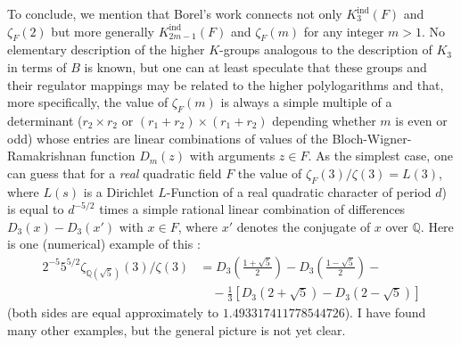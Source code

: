 To conclude, we mention that Borel's work connects not only $K^{\text{ind}}_{3}(F)$ and $\zeta_{F}(2)$ but more generally $K^{\text{ind}}_{2m-1}(F)$ and $\zeta_{F}(m)$ for any integer $m>1$. No elementary description of the higher $K$-groups analogous to the description of $K_{3}$ in terms of $B$ is known, but one can at least speculate that these groups and their regulator mappings may be related to the higher polylogarithms and that, more specifically, the value of $\zeta_{F}(m)$ is always a simple multiple of a determinant ($r_{2}\times r_{2}$ or $(r_{1}+r_{2})\times (r_{1}+r_{2})$ depending whether $m$ is even or odd) whose entries are linear combinations of values of the Bloch-Wigner-Ramakrishnan function $D_{m}(z)$ with arguments $z\in F$. As the simplest case, one can guess that for a {\em real} quadratic field $F$ the value of $\zeta_{F}(3)/\zeta(3)=L(3)$, where $L(s)$ is a Dirichlet $L$-Function of a real quadratic character of period $d$) is equal to $d^{-5/2}$ times a simple rational linear combination of differences $D_{3}(x)-D_{3}(x')$ with $x\in F$, where $x'$ denotes the conjugate of $x$ over $\mathbb{Q}$. Here is one (numerical) example of this :
\begin{align*}
2^{-5}5^{5/2}\zeta_{\mathbb{Q}(\sqrt{5})}(3)/\zeta(3) &= D_{3}\left(\frac{1+\sqrt{5}}{2}\right)-D_{3}\left(\frac{1-\sqrt{5}}{2}\right)-{}\\
&\quad {}-\frac{1}{3}[D_{3}(2+\sqrt{5})-D_{3}(2-\sqrt{5})]
\end{align*}
(both sides are equal approximately to $1.493317411778544726$). I have found many other examples, but the general picture is not yet clear.

